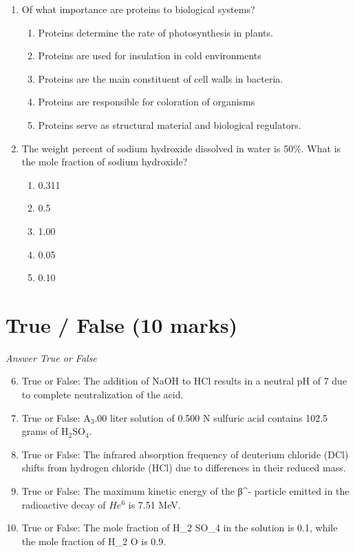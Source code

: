 \documentclass[12pt]{article}
\begin{document}
\begin{enumerate}[label=\arabic*.]
\begin{enumerate}[label=(\alph*)]
    \item 2.26 \ensuremath{\times} 10^\{-2\} $\mathrm{~m}^3 \mathrm{~mol}^{-1}$
\end{enumerate}
\item Of what importance are proteins to biological systems?
\begin{enumerate}[label=(\alph*)]
    \item Proteins determine the rate of photosynthesis in plants.
    \item Proteins are used for insulation in cold environments
    \item Proteins are the main constituent of cell walls in bacteria.
    \item Proteins are responsible for coloration of organisms
    \item Proteins serve as structural material and biological regulators.
\end{enumerate}
\item The weight percent of sodium hydroxide dissolved in water is 50\%. What is the mole fraction of sodium hydroxide?
\begin{enumerate}[label=(\alph*)]
    \item 0.311
    \item 0.5
    \item 1.00
    \item 0.05
    \item 0.10
\end{enumerate}
\end{enumerate}

\section*{True / False (10 marks)}
\textit{Answer True or False}
\begin{enumerate}[label=\arabic*.]
\setcounter{enumi}{5}
\item True or False: The addition of NaOH to HCl results in a neutral pH of 7 due to complete neutralization of the acid.
\item True or False: A$_{3}$.00 liter solution of 0.500 N sulfuric acid contains 102.5 grams of H$_{2}$SO$_{4}$.
\item True or False: The infrared absorption frequency of deuterium chloride (DCl) shifts from hydrogen chloride (HCl) due to differences in their reduced mass.
\item True or False: The maximum kinetic energy of the β^- particle emitted in the radioactive decay of $He^6$ is 7.51 MeV.
\item True or False: The mole fraction of H\_2 SO\_4 in the solution is 0.1, while the mole fraction of H\_2 O is 0.9.
\end{enumerate}
\end{document}
